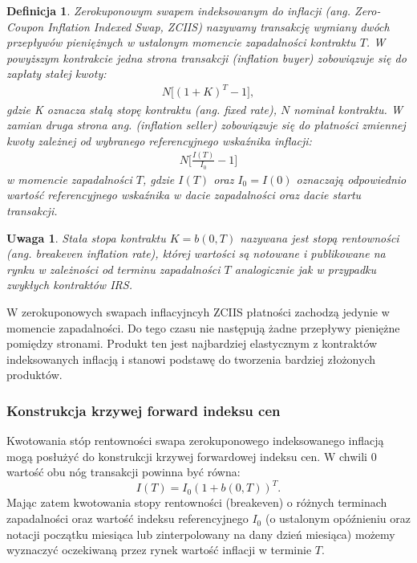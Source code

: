 \documentclass{mini}
\theoremstyle{mythstyle}
\newtheorem{Definicja}{Definicja}[chapter]
\newtheorem{Uwaga}{Uwaga}[chapter]
\begin{document}
	\begin{Definicja}
		Zerokuponowym swapem indeksowanym do inflacji (ang. Zero-Coupon Inflation Indexed Swap, ZCIIS) nazywamy transakcję wymiany dwóch przepływów pieniężnych w ustalonym momencie zapadalności kontraktu $T$. W powyższym kontrakcie jedna strona transakcji (inflation buyer) zobowiązuje się do zapłaty stałej kwoty:
		\begin{eqnarray*}
			N\bigg[(1+K)^T -1\bigg],
		\end{eqnarray*}
		gdzie K oznacza stałą stopę kontraktu (ang. fixed rate), $N$ nominał kontraktu. W zamian druga strona ang. (inflation seller) zobowiązuje się do płatności zmiennej kwoty zależnej od wybranego referencyjnego wskaźnika inflacji:
		\begin{eqnarray*}
			N\bigg[\frac{I(T)}{I_0} - 1\bigg]
		\end{eqnarray*}
		w momencie zapadalności $T$, gdzie $I(T)$ oraz  $I_0 = I(0)$ oznaczają odpowiednio wartość referencyjnego wskaźnika w dacie zapadalności oraz dacie startu transakcji.
\end{Definicja}		

\begin{Uwaga}
	Stała stopa kontraktu $K = b(0,T)$ nazywana jest stopą rentowności (ang. breakeven inflation rate), której wartości są notowane i publikowane na rynku w zależności od terminu zapadalności $T$ analogicznie jak w przypadku zwykłych kontraktów IRS.
\end{Uwaga}
	
	W zerokuponowych swapach inflacyjncyh ZCIIS płatności zachodzą jedynie w momencie zapadalności. Do tego czasu nie następują żadne przepływy pieniężne pomiędzy stronami. Produkt ten jest najbardziej elastycznym z kontraktów indeksowanych inflacją i stanowi podstawę do tworzenia bardziej złożonych produktów.
	
	\subsubsection*{Konstrukcja krzywej forward indeksu cen}
	
	Kwotowania stóp rentowności swapa zerokuponowego indeksowanego inflacją mogą posłużyć do konstrukcji krzywej forwardowej indeksu cen. W chwili 0 wartość obu nóg transakcji powinna być równa:
	\begin{equation}
		I(T) = I_0 (1 + b(0,T))^T.
	\end{equation}
	Mając zatem kwotowania stopy rentowności (breakeven) o różnych terminach zapadalności oraz wartość indeksu referencyjnego $I_0$ (o ustalonym opóźnieniu oraz  notacji początku miesiąca lub zinterpolowany na dany dzień miesiąca) możemy wyznaczyć oczekiwaną przez rynek wartość inflacji w terminie $T$.
	
\end{document}
